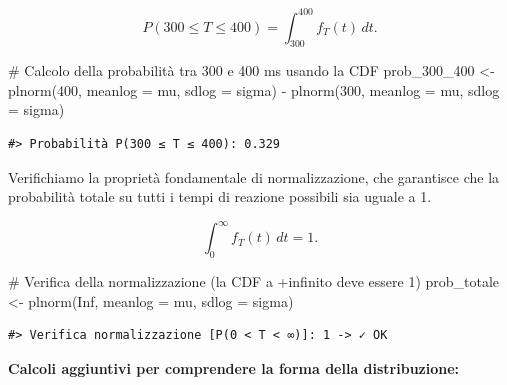 \documentclass[
  letterpaper,
  DIV=11,
  numbers=noendperiod,
  oneside]{scrreprt}
\newenvironment{Shaded}{\begin{snugshade}}{\end{snugshade}}
\newcommand{\AttributeTok}[1]{\textcolor[rgb]{0.40,0.45,0.13}{#1}}
\newcommand{\CommentTok}[1]{\textcolor[rgb]{0.37,0.37,0.37}{#1}}
\newcommand{\ConstantTok}[1]{\textcolor[rgb]{0.56,0.35,0.01}{#1}}
\newcommand{\DecValTok}[1]{\textcolor[rgb]{0.68,0.00,0.00}{#1}}
\newcommand{\FunctionTok}[1]{\textcolor[rgb]{0.28,0.35,0.67}{#1}}
\newcommand{\NormalTok}[1]{\textcolor[rgb]{0.00,0.23,0.31}{#1}}
\newcommand{\OtherTok}[1]{\textcolor[rgb]{0.00,0.23,0.31}{#1}}
\newcommand{\SpecialCharTok}[1]{\textcolor[rgb]{0.37,0.37,0.37}{#1}}
\theoremstyle{definition}
\theoremstyle{plain}
\theoremstyle{definition}
\theoremstyle{remark}
\begin{document}
\begin{tcolorbox}
\[
P(300 \leq T \leq 400) = \int_{300}^{400} f_T(t) \, dt .
\]

\begin{Shaded}
\begin{Highlighting}[]
\CommentTok{\# Calcolo della probabilità tra 300 e 400 ms usando la CDF}
\NormalTok{prob\_300\_400 }\OtherTok{\textless{}{-}} \FunctionTok{plnorm}\NormalTok{(}\DecValTok{400}\NormalTok{, }\AttributeTok{meanlog =}\NormalTok{ mu, }\AttributeTok{sdlog =}\NormalTok{ sigma) }\SpecialCharTok{{-}} \FunctionTok{plnorm}\NormalTok{(}\DecValTok{300}\NormalTok{, }\AttributeTok{meanlog =}\NormalTok{ mu, }\AttributeTok{sdlog =}\NormalTok{ sigma)}
\end{Highlighting}
\end{Shaded}

\begin{verbatim}
#> Probabilità P(300 ≤ T ≤ 400): 0.329
\end{verbatim}

Verifichiamo la proprietà fondamentale di normalizzazione, che
garantisce che la probabilità totale su tutti i tempi di reazione
possibili sia uguale a 1.

\[
\int_{0}^{\infty} f_T(t) \, dt = 1.
\]

\begin{Shaded}
\begin{Highlighting}[]
\CommentTok{\# Verifica della normalizzazione (la CDF a +infinito deve essere 1)}
\NormalTok{prob\_totale }\OtherTok{\textless{}{-}} \FunctionTok{plnorm}\NormalTok{(}\ConstantTok{Inf}\NormalTok{, }\AttributeTok{meanlog =}\NormalTok{ mu, }\AttributeTok{sdlog =}\NormalTok{ sigma)}
\end{Highlighting}
\end{Shaded}

\begin{verbatim}
#> Verifica normalizzazione [P(0 < T < ∞)]: 1 -> ✓ OK
\end{verbatim}

\textbf{Calcoli aggiuntivi per comprendere la forma della
distribuzione:}


\end{tcolorbox}
\end{document}
